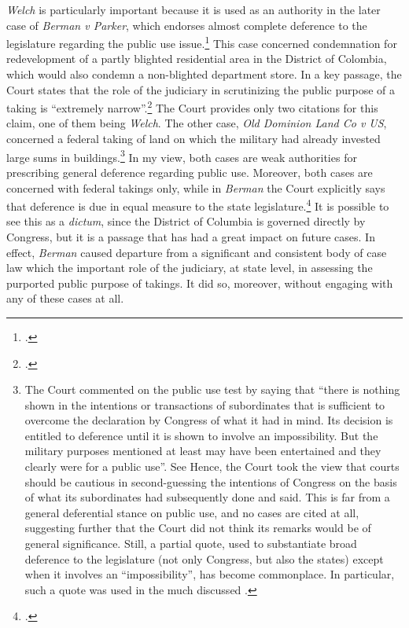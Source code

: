 {\it Welch} is particularly important because it is used as an authority in the later case of {\it Berman v Parker}, which endorses almost complete deference to the legislature regarding the public use issue.\footcite[32]{berman54} This case concerned condemnation for redevelopment of a partly blighted residential area in the District of Colombia, which would also condemn a non-blighted department store. In a key passage, the Court states that the role of the judiciary in scrutinizing the public purpose of a taking is ``extremely narrow''.\footcite[32]{berman54} The Court provides only two citations for this claim, one of them being {\it Welch}. The other case, {\it Old Dominion Land Co v US}, concerned a federal taking of land on which the military had already invested large sums in buildings.\footnote{The Court commented on the public use test by saying that ``there is nothing shown in the intentions or transactions of subordinates that is sufficient to overcome the declaration by Congress of what it had in mind. Its decision is entitled to deference until it is shown to involve an impossibility. But the military purposes mentioned at least may have been entertained and they clearly were for a public use''. See \cite[66]{dominion25} Hence, the Court took the view that courts should be cautious in second-guessing the intentions of Congress on the basis of what its subordinates had subsequently done and said. This is far from a general deferential stance on public use, and no cases are cited at all, suggesting further that the Court did not think its remarks would be of general significance. Still, a partial quote, used to substantiate  broad deference to the legislature (not only Congress, but also the states) except when it involves an ``impossibility'', has become commonplace. In particular, such a quote was used in the much discussed \cite[240]{midkiff84}.}
In my view, both cases are weak authorities for prescribing general deference regarding public use. Moreover, both cases are concerned with federal takings only, while in {\it Berman} the Court explicitly says that deference is due in equal measure to the state legislature.\footcite[32]{berman54} It is possible to see this as a {\it dictum}, since the District of Columbia is governed directly by Congress, but it is a passage that has had a great impact on future cases. In effect, {\it Berman} caused departure from a significant and consistent body of case law which  the important role of the judiciary, at state level, in assessing the purported public purpose of takings. It did so, moreover, without engaging with any of these cases at all.

